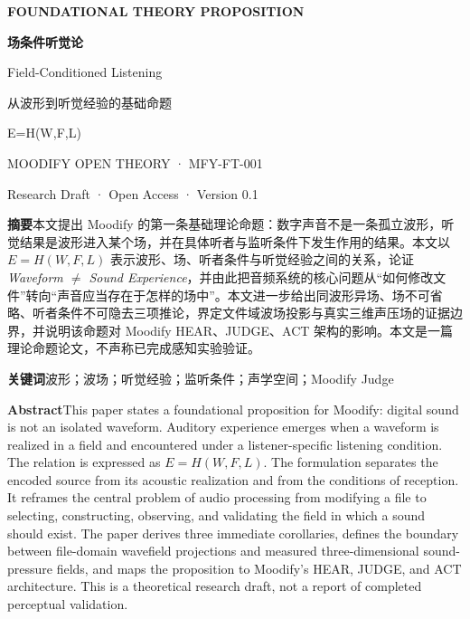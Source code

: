 \documentclass[10pt,a4paper]{article}
\begin{document}
\begin{center}
{\small\bfseries\color{MoodViolet} FOUNDATIONAL THEORY PROPOSITION}\par
\vspace{1.1cm}
{\fontsize{28}{31}\selectfont\bfseries 场条件听觉论}\par
\vspace{0.3cm}
{\Large Field-Conditioned Listening}\par
\vspace{0.55cm}
{\large 从波形到听觉经验的基础命题}\par
\vspace{1cm}
\colorbox{MoodPale}{\parbox{0.82\linewidth}{\centering\vspace{0.45cm}
{\Large\displaystyle E=H(W,F,L)}
\vspace{0.45cm}}}
\vspace{1cm}

{\small MOODIFY OPEN THEORY · MFY-FT-001}\par
{\small Research Draft · Open Access · Version 0.1}\par
\end{center}

\vspace{1cm}
\textbf{摘要}\quad 本文提出 Moodify 的第一条基础理论命题：数字声音不是一条孤立波形，听觉结果是波形进入某个场，并在具体听者与监听条件下发生作用的结果。本文以 $E=H(W,F,L)$ 表示波形、场、听者条件与听觉经验之间的关系，论证 \emph{Waveform $\neq$ Sound Experience}，并由此把音频系统的核心问题从“如何修改文件”转向“声音应当存在于怎样的场中”。本文进一步给出同波形异场、场不可省略、听者条件不可隐去三项推论，界定文件域波场投影与真实三维声压场的证据边界，并说明该命题对 Moodify HEAR、JUDGE、ACT 架构的影响。本文是一篇理论命题论文，不声称已完成感知实验验证。

\textbf{关键词}\quad 波形；波场；听觉经验；监听条件；声学空间；Moodify Judge

\vspace{0.5cm}
\textbf{Abstract}\quad This paper states a foundational proposition for Moodify: digital sound is not an isolated waveform. Auditory experience emerges when a waveform is realized in a field and encountered under a listener-specific listening condition. The relation is expressed as $E=H(W,F,L)$. The formulation separates the encoded source from its acoustic realization and from the conditions of reception. It reframes the central problem of audio processing from modifying a file to selecting, constructing, observing, and validating the field in which a sound should exist. The paper derives three immediate corollaries, defines the boundary between file-domain wavefield projections and measured three-dimensional sound-pressure fields, and maps the proposition to Moodify's HEAR, JUDGE, and ACT architecture. This is a theoretical research draft, not a report of completed perceptual validation.
\end{document}
